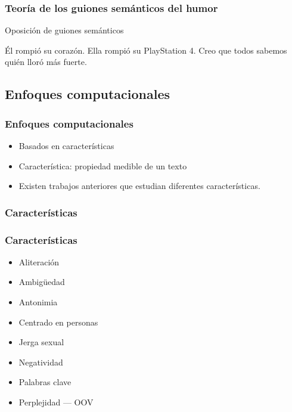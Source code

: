 \begin{frame}
    \frametitle{Teoría de los guiones semánticos del humor}

    Oposición de guiones semánticos

    \begin{example}
        Él rompió su corazón. Ella rompió su PlayStation 4. Creo que todos sabemos quién lloró más fuerte.
    \end{example}
\end{frame}


\subsection{Enfoques computacionales}
\begin{frame}
    \frametitle{Enfoques computacionales}

    \begin{itemize}
        \item Basados en características

        \item Característica: propiedad medible de un texto

        \item Existen trabajos anteriores que estudian diferentes características.
    \end{itemize}
\end{frame}

\subsubsection{Características}

\begin{frame}
    \frametitle{Características}

    \begin{itemize}
        \item Aliteración
        \item Ambigüedad
        \item Antonimia
        \item Centrado en personas
        \item Jerga sexual
        \item Negatividad
        \item Palabras clave
        \item Perplejidad --- OOV
    \end{itemize}
\end{frame}

